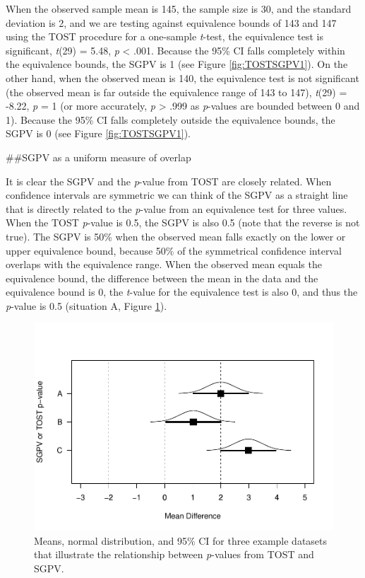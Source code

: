\documentclass[,man,floatsintext]{apa6}
\begin{document}
When the observed sample mean is 145, the sample size is 30, and the standard deviation is 2, and we are testing against equivalence bounds of 143 and 147 using the TOST procedure for a one-sample \emph{t}-test, the equivalence test is significant, \emph{t}(29) = 5.48, \emph{p} \textless{} .001. Because the 95\% CI falls completely within the equivalence bounds, the SGPV is 1 (see Figure \ref{fig:TOSTSGPV1}).
On the other hand, when the observed mean is 140, the equivalence test is not significant (the observed mean is far outside the equivalence range of 143 to 147), \emph{t}(29) = -8.22, \emph{p} = 1 (or more accurately, \emph{p} \textgreater{} .999 as \emph{p}-values are bounded between 0 and 1). Because the 95\% CI falls completely outside the equivalence bounds, the SGPV is 0 (see Figure \ref{fig:TOSTSGPV1}).

\#\#SGPV as a uniform measure of overlap

It is clear the SGPV and the \emph{p}-value from TOST are closely related. When confidence intervals are symmetric we can think of the SGPV as a straight line that is directly related to the \emph{p}-value from an equivalence test for three values. When the TOST \emph{p}-value is 0.5, the SGPV is also 0.5 (note that the reverse is not true). The SGPV is 50\% when the observed mean falls exactly on the lower or upper equivalence bound, because 50\% of the symmetrical confidence interval overlaps with the equivalence range. When the observed mean equals the equivalence bound, the difference between the mean in the data and the equivalence bound is 0, the \emph{t}-value for the equivalence test is also 0, and thus the \emph{p}-value is 0.5 (situation A, Figure \ref{fig:TOSTSGPV3}).

\begin{figure}
\centering
\includegraphics{manuscript_files/figure-latex/TOSTSGPV3-1.pdf}
\caption{\label{fig:TOSTSGPV3}Means, normal distribution, and 95\% CI for three example datasets that illustrate the relationship between \emph{p}-values from TOST and SGPV.}
\end{figure}
\end{document}
